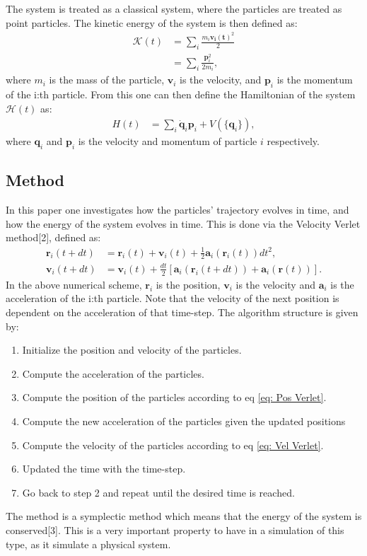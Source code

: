 \documentclass[a4paper]{article}
\newcommand{\newparagraph}{\vspace{.5cm}\noindent}
\begin{document}
\newparagraph
The system is treated as a classical system, where the particles are treated as point particles. The kinetic energy of the system is then defined as:
\begin{align*}
    \mathcal{K}(t) &= \sum_i \frac{m_i\mathbf{\mathbf{v}_i(t)}^2}{2}\\
    &=\sum_i \frac{\mathbf{p}_i^2}{2m_i},
\end{align*}where $m_i$ is the mass of the particle, $\mathbf{v}_i$ is the velocity, and $\mathbf{p}_i$ is the momentum of the i:th particle.
From this one can then define the Hamiltonian of the system $\mathcal{H}(t)$ as:
\begin{align}
    H(t) &= \sum_i \dot{\mathbf{q}}_i\mathbf{p}_i + V(\{\mathbf{q}_i\}), \label{eq: Hamiltonian}
\end{align}where $\mathbf{q}_i$ and $\mathbf{p}_i$ is the velocity and momentum of particle $i$ respectively.

\subsection{Method}
In this paper one investigates how the particles' trajectory evolves in time, and how the energy of the system evolves in time.
This is done via the Velocity Verlet method[2], defined as:
\begin{align}
    \mathbf{r}_i(t + dt) &= \mathbf{r}_i(t) + \mathbf{v}_i(t) + \frac{1}{2}\mathbf{a}_i(\mathbf{r}_i(t))dt^2,\label{eq: Pos Verlet}\\
    \mathbf{v}_i(t + dt) &= \mathbf{v}_i(t) + \frac{dt}{2}\left[\mathbf{a}_i(\mathbf{r}_i(t + dt)) + \mathbf{a}_i(\mathbf{r}(t))\right].\label{eq: Vel Verlet}
\end{align}
In the above numerical scheme, $\mathbf{r}_i$ is the position, $\mathbf{v}_i$ is the velocity and $\mathbf{a}_i$ is the acceleration of the i:th particle. Note that the velocity of the next position is dependent on the acceleration of that time-step.
The algorithm structure is given by:
\begin{enumerate}
    \item Initialize the position and velocity of the particles.
    \item Compute the acceleration of the particles.
    \item Compute the position of the particles according to eq \eqref{eq: Pos Verlet}.
    \item Compute the new acceleration of the particles given the updated positions
    \item Compute the velocity of the particles according to eq \eqref{eq: Vel Verlet}.
    \item Updated the time with the time-step.
    \item Go back to step 2 and repeat until the desired time is reached. 
\end{enumerate}
The method is a symplectic method which means that the energy of the system is conserved[3]. This is a very important property to have in a simulation of this type, as it simulate a physical system.
\end{document}
